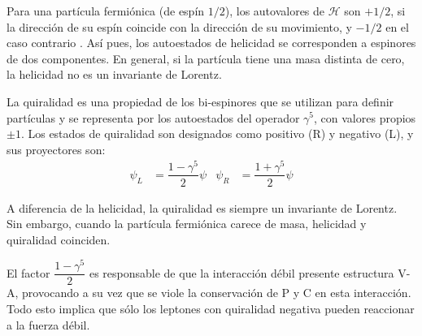 Para una partícula fermiónica (de espín $1/2$), los autovalores de $\mathcal{H}$ son $+1/2$, si la dirección de su espín coincide con la dirección de su movimiento, y $-1/2$ en el caso contrario \cite{Bettini}. Así pues, los autoestados de helicidad se corresponden a espinores de dos componentes. En general, si la partícula tiene una masa distinta de cero, la helicidad no es un invariante de Lorentz.

La quiralidad es una propiedad de los bi-espinores que se utilizan para definir partículas y se representa por los autoestados del operador $\gamma^5$, con valores propios $\pm 1$. Los estados de quiralidad son designados como positivo (R) y negativo (L), y sus proyectores son:
\begin{align}
\psi_L &= \dfrac{1-\gamma^5}{2}\psi & \psi_R &= \dfrac{1+\gamma^5}{2}\psi
\end{align}

A diferencia de la helicidad, la quiralidad es siempre un invariante de Lorentz. Sin embargo, cuando la partícula fermiónica carece de masa, helicidad y quiralidad coinciden.

El factor $\dfrac{1-\gamma^5}{2}$ es responsable de que la interacción débil presente estructura V-A, provocando a su vez que se viole la conservación de P y C en esta interacción. Todo esto implica que sólo los leptones con quiralidad negativa pueden reaccionar a la fuerza débil.


